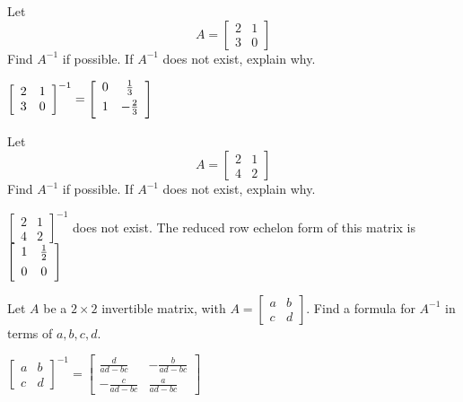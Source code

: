 \documentclass{ximera}
\begin{document}
\begin{problem}\label{prb:4.37}Let
\begin{equation*}
A=\left[
\begin{array}{rr}
2 & 1 \\
3 & 0
\end{array}
\right]
\end{equation*}
Find $A^{-1}$ if possible. If $A^{-1}$ does not exist, explain why.
\begin{hint}
$\left[
\begin{array}{cc}
2 & 1 \\
3 & 0
\end{array}
\right]^{-1}= \left[
\begin{array}{cc}
0 & \vspace{0.05in}\frac{1}{3} \\
1 & -\vspace{0.05in}\frac{2}{3}
\end{array}
\right]$
\end{hint}
\end{problem}

\begin{problem}\label{prb:4.38}Let
\begin{equation*}
A=\left[
\begin{array}{rr}
2 & 1 \\
4 & 2
\end{array}
\right]
\end{equation*}
Find $A^{-1}$ if possible. If $A^{-1}$ does not exist, explain why.
\begin{hint}
$\left[
\begin{array}{cc}
2 & 1 \\
4 & 2
\end{array}
\right]^{-1}$ does not exist. The reduced row echelon form of this matrix
is $\left[
\begin{array}{cc}
1 & \vspace{0.05in}\frac{1}{2} \\
0 & 0
\end{array}
\right]$
\end{hint}
\end{problem}

\begin{problem}\label{prb:4.39}Let $A$ be a $2\times 2$ invertible matrix, with $A=\left[
\begin{array}{cc}
a & b \\
c & d
\end{array}
\right] .$ Find a formula for $A^{-1}$ in terms of $a,b,c,d$.
\begin{hint}
$\left[
\begin{array}{cc}
a & b \\
c & d
\end{array}
\right]^{-1}= \left[
\begin{array}{cc}
\frac{d}{ad-bc} & -\frac{b}{ad-bc} \\
-\frac{c}{ad-bc} & \frac{a}{ad-bc}
\end{array}
\right]$
\end{hint}
\end{problem}
\end{document}
